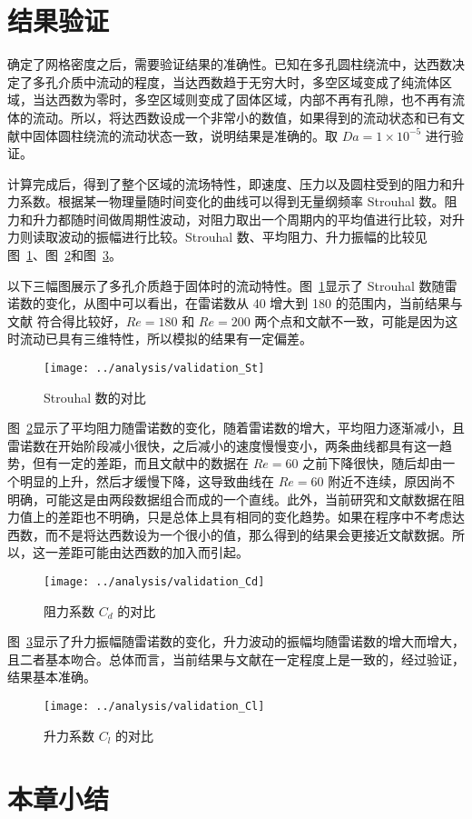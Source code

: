 \section{结果验证}\label{sec: validation}

确定了网格密度之后，需要验证结果的准确性。已知在多孔圆柱绕流中，达西数决定了多孔介质中流动的程度，当达西数趋于无穷大时，多空区域变成了纯流体区域，当达西数为零时，多空区域则变成了固体区域，内部不再有孔隙，也不再有流体的流动。所以，将达西数设成一个非常小的数值，如果得到的流动状态和已有文献中固体圆柱绕流的流动状态一致，说明结果是准确的。取 $Da=1\times 10^{-5}$ 进行验证。

计算完成后，得到了整个区域的流场特性，即速度、压力以及圆柱受到的阻力和升力系数。根据某一物理量随时间变化的曲线可以得到无量纲频率 Strouhal 数。阻力和升力都随时间做周期性波动，对阻力取出一个周期内的平均值进行比较，对升力则读取波动的振幅进行比较。Strouhal 数、平均阻力、升力振幅的比较见图~\ref{fig: validation-St}、图~\ref{fig: validation-Cd}和图~\ref{fig: validation-Cl}。

以下三幅图展示了多孔介质趋于固体时的流动特性。图~\ref{fig: validation-St}显示了 Strouhal 数随雷诺数的变化，从图中可以看出，在雷诺数从 40 增大到 180 的范围内，当前结果与文献 \cite{} 符合得比较好，$Re=180$ 和 $Re=200$ 两个点和文献不一致，可能是因为这时流动已具有三维特性，所以模拟的结果有一定偏差。

\begin{figure}
	\centering
	\texttt{[image: ../analysis/validation\_St]}
	\caption{Strouhal 数的对比}
	\label{fig: validation-St}
\end{figure}

图~\ref{fig: validation-Cd}显示了平均阻力随雷诺数的变化，随着雷诺数的增大，平均阻力逐渐减小，且雷诺数在开始阶段减小很快，之后减小的速度慢慢变小，两条曲线都具有这一趋势，但有一定的差距，而且文献中的数据在 $Re=60$ 之前下降很快，随后却由一个明显的上升，然后才缓慢下降，这导致曲线在 $Re=60$ 附近不连续，原因尚不明确，可能这是由两段数据组合而成的一个直线。此外，当前研究和文献数据在阻力值上的差距也不明确，只是总体上具有相同的变化趋势。如果在程序中不考虑达西数，而不是将达西数设为一个很小的值，那么得到的结果会更接近文献数据。所以，这一差距可能由达西数的加入而引起。

\begin{figure}
	\centering
	\texttt{[image: ../analysis/validation\_Cd]}
	\caption{阻力系数 $C_d$ 的对比}
	\label{fig: validation-Cd}
\end{figure}

图~\ref{fig: validation-Cl}显示了升力振幅随雷诺数的变化，升力波动的振幅均随雷诺数的增大而增大，且二者基本吻合。总体而言，当前结果与文献在一定程度上是一致的，经过验证，结果基本准确。

\begin{figure}
	\centering
	\texttt{[image: ../analysis/validation\_Cl]}
	\caption{升力系数 $C_l$ 的对比}
	\label{fig: validation-Cl}
\end{figure}

\section{本章小结}
